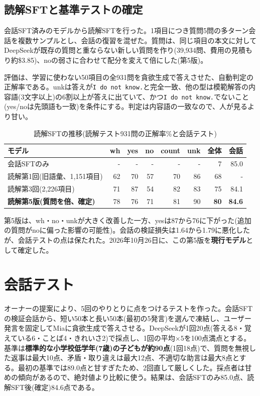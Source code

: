 \documentclass[a4paper,11pt]{article}
\newcommand{\IDK}{\texttt{I do not know.}}
\begin{document}
\subsection{読解SFTと基準テストの確定}
会話SFT済みのモデルから読解SFTを行った。1項目につき質問5問の多ターン会話を複数サンプルとし、会話の復習を混ぜた。質問は、同じ項目の本文に対してDeepSeekが既存の質問と重ならない新しい質問を作り(39,934問、費用の見積もり約\$3.85)、noの弱さに合わせて配分を変えて倍にした(第5版)。

評価は、学習に使わない50項目の全931問を貪欲生成で答えさせた、自動判定の正解率である。unkは答えが\IDK と完全一致、他の型は模範解答の内容語(3文字以上)の6割以上が答えに出ていて、かつ\IDK でないこと(yes/noは先頭語も一致)を条件にする。判定は内容語の一致なので、人が見るより甘い。

\begin{table}[H]\centering\small
\caption{読解SFTの推移(読解テスト931問の正解率\%と会話テスト)}\label{tab:read}
\begin{tabular}{lrrrrrrr}\toprule
モデル & wh & yes & no & count & unk & 全体 & 会話\\\midrule
会話SFTのみ & - & - & - & - & - & 7 & 85.0\\
読解第1回(旧語彙、1,151項目) & 62 & 70 & 57 & 70 & 86 & 68 & -\\
読解第3回(2,226項目) & 71 & 87 & 54 & 82 & 83 & 75 & 84.1\\
\textbf{読解第5版(質問を倍、確定)} & 78 & 76 & 71 & 81 & 90 & \textbf{80} & \textbf{84.6}\\\bottomrule
\end{tabular}\end{table}

第5版は、wh・no・unkが大きく改善した一方、yesは87から76に下がった(追加の質問がnoに偏った影響の可能性)。会話の検証損失は1.64から1.79に悪化したが、会話テストの点は保たれた。2026年10月26日に、この第5版を\textbf{現行モデル}として確定した。

\section{会話テスト}
オーナーの提案により、5回のやりとりに点をつけるテストを作った。会話SFTの検証会話から、短い50本と長い50本(最初の5発言)を選んで凍結し、ユーザー発言を固定してMiaに貪欲生成で答えさせる。DeepSeekが1回20点(答える8・覚えている6・ことば4・きれいさ2)で採点し、1回の平均$\times5$を100点満点とする。基準は\textbf{標準的な小学校低学年(7歳)の子どもが約90点}(1回18点)で、質問を無視した返事は最大10点、矛盾・取り違えは最大12点、不適切な助言は最大8点とする。最初の基準では89.0点と甘すぎたため、2回直して厳しくした。採点者は甘めの傾向があるので、絶対値より比較に使う。結果は、会話SFTのみ85.0点、読解SFT後(確定)84.6点である。
\end{document}
